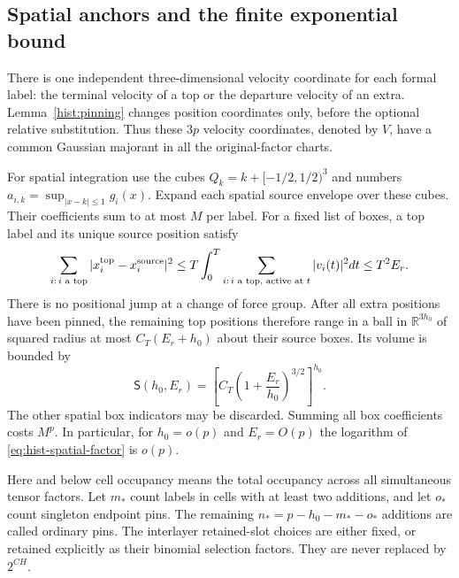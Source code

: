 \subsection{Spatial anchors and the finite exponential bound}

There is one independent three-dimensional velocity coordinate for
each formal label: the terminal velocity of a top or the departure
velocity of an extra.  Lemma~\ref{hist:pinning} changes position
coordinates only, before the optional relative substitution.  Thus
these $3p$ velocity coordinates, denoted by $V$, have a common Gaussian
majorant in all the original-factor charts.

For spatial integration use the cubes
$Q_k=k+[-1/2,1/2)^3$ and numbers
$a_{i,k}=\sup_{|x-k|\leq1}g_i(x)$.  Expand each spatial source envelope
over these cubes.  Their coefficients sum to at most $M$ per label.
For a fixed list of boxes, a top label and its unique source position
satisfy
\begin{equation}
 \sum_{\substack{i:\,i\text{ a top}}}|x_i^{\rm top}-x_i^{\rm source}|^2
 \leq T\int_0^T\sum_{\substack{i:\,i\text{ a top, active at }t}}|v_i(t)|^2dt
 \leq T^2E_r.
 \label{eq:hist-top-displacement}
\end{equation}
There is no positional jump at a change of force group.  After all
extra positions have been pinned, the remaining top positions
therefore range in a ball in $\mathbb R^{3h_0}$ of squared radius at
most $C_T(E_r+h_0)$ about their source boxes.  Its volume is bounded by
\begin{equation}
 \mathsf S(h_0,E_r)
   =\left[C_T\left(1+\frac{E_r}{h_0}\right)^{3/2}\right]^{h_0}.
 \label{eq:hist-spatial-factor}
\end{equation}
The other spatial box indicators may be discarded.  Summing all box
coefficients costs $M^p$.  In particular, for $h_0=o(p)$ and
$E_r=O(p)$ the logarithm of \eqref{eq:hist-spatial-factor} is $o(p)$.

Here and below cell occupancy means the total occupancy across all
simultaneous tensor factors.  Let $m_*$ count labels in cells with at
least two additions, and let $o_*$ count singleton endpoint pins.
The remaining $n_*=p-h_0-m_*-o_*$ additions are called ordinary pins.
The interlayer retained-slot choices are either fixed, or retained
explicitly as their binomial selection factors.  They are never
replaced by $2^{CH}$.

